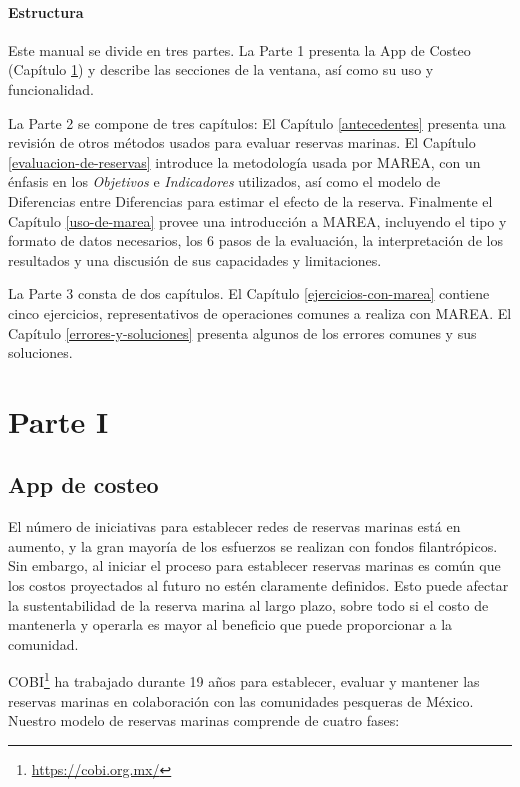 \documentclass[]{krantz}
\renewcommand{\href}[2]{#2\footnote{\url{#1}}}
\begin{document}
\hypertarget{estructura}{%
\subsection{Estructura}\label{estructura}}

Este manual se divide en tres partes. La Parte 1 presenta la App de Costeo (Capítulo \ref{app-de-costeo}) y describe las secciones de la ventana, así como su uso y funcionalidad.

La Parte 2 se compone de tres capítulos: El Capítulo \ref{antecedentes} presenta una revisión de otros métodos usados para evaluar reservas marinas. El Capítulo \ref{evaluacion-de-reservas} introduce la metodología usada por MAREA, con un énfasis en los \emph{Objetivos} e \emph{Indicadores} utilizados, así como el modelo de Diferencias entre Diferencias para estimar el efecto de la reserva. Finalmente el Capítulo \ref{uso-de-marea} provee una introducción a MAREA, incluyendo el tipo y formato de datos necesarios, los 6 pasos de la evaluación, la interpretación de los resultados y una discusión de sus capacidades y limitaciones.

La Parte 3 consta de dos capítulos. El Capítulo \ref{ejercicios-con-marea} contiene cinco ejercicios, representativos de operaciones comunes a realiza con MAREA. El Capítulo \ref{errores-y-soluciones} presenta algunos de los errores comunes y sus soluciones.

\mainmatter

\hypertarget{part-parte-i}{%
\part{Parte I}\label{part-parte-i}}

\hypertarget{app-de-costeo}{%
\chapter{App de costeo}\label{app-de-costeo}}

El número de iniciativas para establecer redes de reservas marinas está en aumento, y la gran mayoría de los esfuerzos se realizan con fondos filantrópicos. Sin embargo, al iniciar el proceso para establecer reservas marinas es común que los costos proyectados al futuro no estén claramente definidos. Esto puede afectar la sustentabilidad de la reserva marina al largo plazo, sobre todo si el costo de mantenerla y operarla es mayor al beneficio que puede proporcionar a la comunidad.

\href{https://cobi.org.mx/}{COBI} ha trabajado durante 19 años para establecer, evaluar y mantener las reservas marinas en colaboración con las comunidades pesqueras de México. Nuestro modelo de reservas marinas comprende de cuatro fases:
\end{document}

